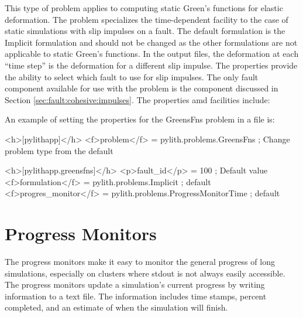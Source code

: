 This type of problem applies to computing static Green's functions
for elastic deformation. The  problem specializes
the time-dependent facility to the case of static simulations with
slip impulses on a fault. The default formulation is the Implicit
formulation and should not be changed as the other formulations are
not applicable to static Green's functions. In the output files, the
deformation at each ``time step'' is the deformation for a different
slip impulse. The properties provide the ability to select which fault
to use for slip impulses. The only fault component available for use
with the  problem is the 
component discussed in Section \vref{sec:fault:cohesive:impulses}.
The  properties amd facilities include:
\begin{inventory}
\end{inventory}
An example of setting the properties for the GreensFns problem in
a  file is:
\begin{cfg}
<h>[pylithapp]</h>
<f>problem</f> = pylith.problems.GreensFns ; Change problem type from the default

<h>[pylithapp.greensfns]</h>
<p>fault_id</p> = 100 ; Default value
<f>formulation</f> = pylith.problems.Implicit ; default
<f>progres_monitor</f> = pylith.problems.ProgressMonitorTime ; default
\end{cfg}


\section{Progress Monitors}

The progress monitors make it easy to monitor the general progress of
long simulations, especially on clusters where stdout is not always
easily accessible. The progress monitors update a simulation's current
progress by writing information to a text file. The information
includes time stamps, percent completed, and an estimate of when the
simulation will finish.

